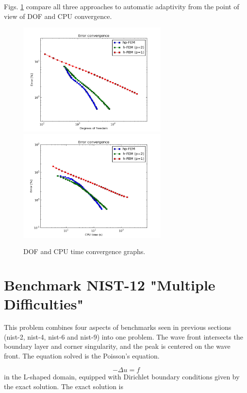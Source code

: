 \documentclass[12pt]{elsarticle}
\begin{document}
Figs. \ref{fig:nist-11-conv} compare all
three approaches to automatic adaptivity from the point
of view of DOF and CPU convergence.

\begin{figure}[H]
\centering
\hspace{-50mm}
\includegraphics[width=7.5cm]{nist/nist-11/conv_dof_aniso.png}\ \
\hspace{-10mm}
\includegraphics[width=7.5cm]{nist/nist-11/conv_cpu_aniso.png}
\hspace{-50mm}
\caption{DOF and CPU time convergence graphs.}
\label{fig:nist-11-conv}
\end{figure}


\section{Benchmark NIST-12 "Multiple Difficulties"}
\label{sec:bench-12}

This problem combines four aspects of benchmarks
seen in previous sections (nist-2, nist-4, nist-6 and nist-9) into one problem.
The wave front intersects the boundary
layer and corner singularity, and the peak is centered on the wave front.
The equation solved is the Poisson's equation.

\begin{equation} \label{multiple}
-\Delta u = f
\end{equation}
in the L-shaped domain, equipped with Dirichlet boundary conditions
given by the exact solution.
The exact solution is
\end{document}
